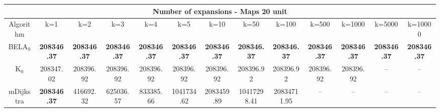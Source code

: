 \begin{tabular}{c|cccccccccccc}\toprule
\multicolumn{13}{c}{Number of expansions - Maps 20 unit}\\ \midrule
Algorithm & k=1 & k=2 & k=3 & k=4 & k=5 & k=10 & k=50 & k=100 & k=500 & k=1000 & k=5000 & k=10000 \\ \midrule
BELA$_0$ & \textbf{208346.37} & \textbf{208346.37} & \textbf{208346.37} & \textbf{208346.37} & \textbf{208346.37} & \textbf{208346.37} & \textbf{208346.37} & \textbf{208346.37} & \textbf{208346.37} & \textbf{208346.37} & \textbf{208346.37} & \textbf{208346.37} \\
K$_0$ & 208347.02 & 208396.92 & 208396.92 & 208396.92 & 208396.92 & 208396.92 & 208396.92 & 208396.92 & 208396.92 & 208396.92 & -- & -- \\
mDijkstra & \textbf{208346.37} & 416692.32 & 625036.57 & 833385.66 & 1041734.62 & 2083459.89 & 10417298.41 & 20834711.95 & -- & -- & -- & -- \\ \bottomrule 
\end{tabular}
